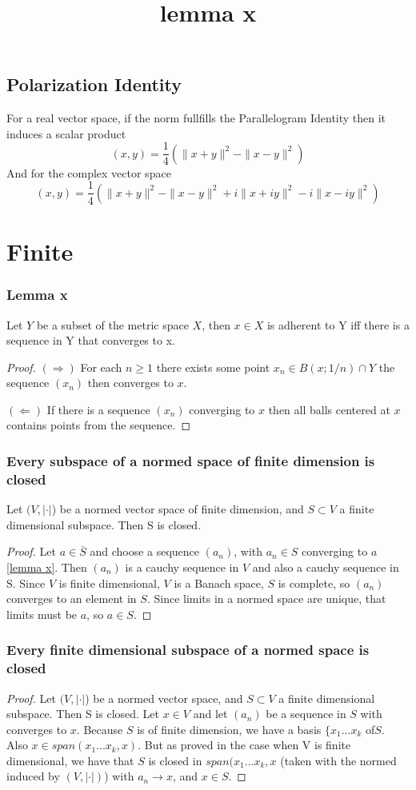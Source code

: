\documentclass[titlepage]{article}
\begin{document}
\subsection{Polarization Identity}
For a real vector space, if the norm fullfills the Parallelogram Identity then it induces a scalar product
\begin{equation}
(x,y) = \frac{1}{4}\left(\|x+y\|^2 - \|x-y\|^2\right)
\label{polreel}
\end{equation}
And for the complex vector space
\begin{equation}
(x,y) = \frac{1}{4}\left(\|x+y\|^2 - \|x-y\|^2 +i\|x+iy\|^2 - i\|x-iy\|^2   \right)
\label{polcomp}
\end{equation}
\section{Finite}
\subsubsection{Lemma x}
Let $Y$ be a subset of the metric space $X$, then $x\in X$ is adherent to Y iff there is a sequence in Y that converges to x.
\begin{proof}
\title{lemma x}
$(\Rightarrow)$ For each $n\geq 1$ there exists some point $x_n \in B(x;1/n)\cap Y$ the sequence $(x_n)$ then converges to $x$.

$(\Leftarrow)$  If there is a sequence $(x_n)$ converging to $x$ then all balls centered at $x$ contains points from the sequence.
\end{proof}
\subsubsection{Every subspace of a normed space of finite dimension is closed}
Let $(V, |\cdot|$) be a normed vector space of finite dimension, and $S\subset V$ a finite dimensional subspace. Then S is closed.
\begin{proof}
Let $a\in \overline{S}$ and choose a sequence $(a_n)$, with $a_n \in S$ converging to $a$ \ref{lemma x}. Then $(a_n)$ is a cauchy sequence in $V$ and also a cauchy sequence in S. Since $V$ is finite dimensional, $V$ is a Banach space, $S$ is complete, so $(a_n)$ converges to an element in $S$. Since limits in a normed space are unique, that limits must be $a$, so $a\in S$.
\end{proof}
\subsubsection{Every finite dimensional subspace of a normed space is closed}

\begin{proof}
Let $(V, |\cdot|$) be a normed vector space, and $S\subset V$ a finite dimensional subspace. Then S is closed.
Let $x\in V$ and let $(a_n)$ be a sequence in $S$ with converges to $x$. Because $S$ is of finite dimension, we have a basis $\{x_1...x_k$ of$S$. Also $x\in span(x_1...x_k,x)$. But as proved in the case when V is finite dimensional, we have that $S$ is closed in $span(x_1...x_k,x$ (taken with the normed induced by $(V, |\cdot|)$) with $a_n \rightarrow x$, and $x\in S$.
\end{proof}
\end{document}
